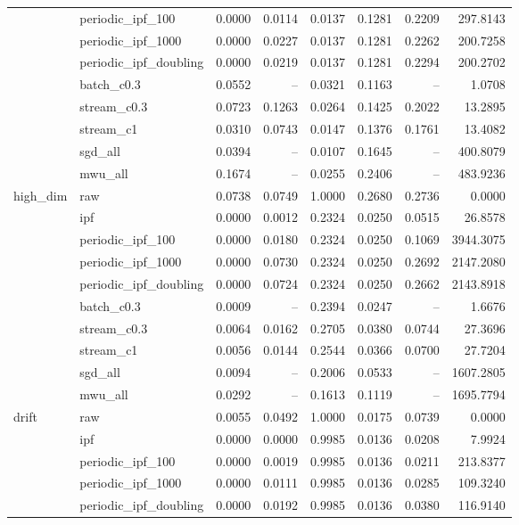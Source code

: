 \begin{tabular}{llrrrrrr}
 & periodic\_ipf\_100 & 0.0000 & 0.0114 & 0.0137 & 0.1281 & 0.2209 & 297.8143 \\
 & periodic\_ipf\_1000 & 0.0000 & 0.0227 & 0.0137 & 0.1281 & 0.2262 & 200.7258 \\
 & periodic\_ipf\_doubling & 0.0000 & 0.0219 & 0.0137 & 0.1281 & 0.2294 & 200.2702 \\
 & batch\_c0.3 & 0.0552 & -- & 0.0321 & 0.1163 & -- & 1.0708 \\
 & stream\_c0.3 & 0.0723 & 0.1263 & 0.0264 & 0.1425 & 0.2022 & 13.2895 \\
 & stream\_c1 & 0.0310 & 0.0743 & 0.0147 & 0.1376 & 0.1761 & 13.4082 \\
 & sgd\_all & 0.0394 & -- & 0.0107 & 0.1645 & -- & 400.8079 \\
 & mwu\_all & 0.1674 & -- & 0.0255 & 0.2406 & -- & 483.9236 \\
\cline{1-8}
\multirow[t]{10}{*}{high\_dim} & raw & 0.0738 & 0.0749 & 1.0000 & 0.2680 & 0.2736 & 0.0000 \\
 & ipf & 0.0000 & 0.0012 & 0.2324 & 0.0250 & 0.0515 & 26.8578 \\
 & periodic\_ipf\_100 & 0.0000 & 0.0180 & 0.2324 & 0.0250 & 0.1069 & 3944.3075 \\
 & periodic\_ipf\_1000 & 0.0000 & 0.0730 & 0.2324 & 0.0250 & 0.2692 & 2147.2080 \\
 & periodic\_ipf\_doubling & 0.0000 & 0.0724 & 0.2324 & 0.0250 & 0.2662 & 2143.8918 \\
 & batch\_c0.3 & 0.0009 & -- & 0.2394 & 0.0247 & -- & 1.6676 \\
 & stream\_c0.3 & 0.0064 & 0.0162 & 0.2705 & 0.0380 & 0.0744 & 27.3696 \\
 & stream\_c1 & 0.0056 & 0.0144 & 0.2544 & 0.0366 & 0.0700 & 27.7204 \\
 & sgd\_all & 0.0094 & -- & 0.2006 & 0.0533 & -- & 1607.2805 \\
 & mwu\_all & 0.0292 & -- & 0.1613 & 0.1119 & -- & 1695.7794 \\
\cline{1-8}
\multirow[t]{10}{*}{drift} & raw & 0.0055 & 0.0492 & 1.0000 & 0.0175 & 0.0739 & 0.0000 \\
 & ipf & 0.0000 & 0.0000 & 0.9985 & 0.0136 & 0.0208 & 7.9924 \\
 & periodic\_ipf\_100 & 0.0000 & 0.0019 & 0.9985 & 0.0136 & 0.0211 & 213.8377 \\
 & periodic\_ipf\_1000 & 0.0000 & 0.0111 & 0.9985 & 0.0136 & 0.0285 & 109.3240 \\
 & periodic\_ipf\_doubling & 0.0000 & 0.0192 & 0.9985 & 0.0136 & 0.0380 & 116.9140 \\

\end{tabular}
